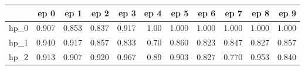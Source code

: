 \begin{tabular}{lrrrrrrrrrr}
\toprule
{} &   ep 0 &   ep 1 &   ep 2 &   ep 3 &  ep 4 &   ep 5 &   ep 6 &   ep 7 &   ep 8 &   ep 9 \\
\midrule
hp\_0 &  0.907 &  0.853 &  0.837 &  0.917 &  1.00 &  1.000 &  1.000 &  1.000 &  1.000 &  1.000 \\
hp\_1 &  0.940 &  0.917 &  0.857 &  0.833 &  0.70 &  0.860 &  0.823 &  0.847 &  0.827 &  0.857 \\
hp\_2 &  0.913 &  0.907 &  0.920 &  0.967 &  0.89 &  0.903 &  0.827 &  0.770 &  0.953 &  0.840 \\
\bottomrule
\end{tabular}
